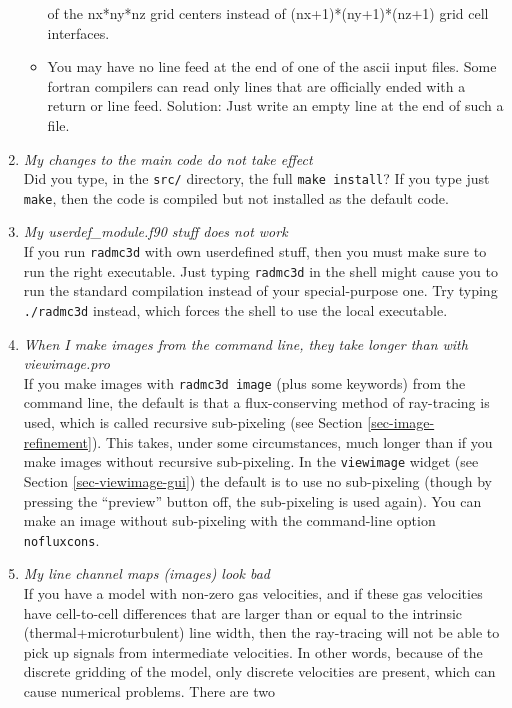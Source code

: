 \documentclass{report}
\begin{document}
\begin{enumerate}
\begin{itemize}
    of the nx*ny*nz grid centers instead of (nx+1)*(ny+1)*(nz+1) grid cell
    interfaces. 
  \item You may have no line feed at the end of one of the ascii input files.
    Some fortran compilers can read only lines that are officially ended with
    a return or line feed. Solution: Just write an empty line at the end of such
    a file.
  \end{itemize}
\item {\em My changes to the main code do not take effect}\\
  Did you type, in the {\small\tt src/} directory, the full {\small\tt make
    install}? If you type just {\small\tt make}, then the code is compiled
  but not installed as the default code.
\item {\em My userdef\_module.f90 stuff does not work}\\
  If you run {\small\tt radmc3d} with own userdefined stuff, then you must
  make sure to run the right executable. Just typing {\small\tt radmc3d} in
  the shell might cause you to run the standard compilation instead of your
  special-purpose one. Try typing {\small\tt ./radmc3d} instead, which
  forces the shell to use the local executable.
\item {\em When I make images from the command line, they take longer than with viewimage.pro}\\
  If you make images with {\small\tt radmc3d image} (plus some keywords)
  from the command line, the default is that a flux-conserving method of
  ray-tracing is used, which is called recursive sub-pixeling (see Section
  \ref{sec-image-refinement}). This takes, under some circumstances, much
  longer than if you make images without recursive sub-pixeling. In the 
  {\small\tt viewimage} widget (see Section \ref{sec-viewimage-gui}) the
  default is to use no sub-pixeling (though by pressing the ``preview''
  button off, the sub-pixeling is used again). You can make an image
  without sub-pixeling with the command-line option {\small\tt nofluxcons}.
\item {\em My line channel maps (images) look bad}\\
  If you have a model with non-zero gas velocities, and if these gas
  velocities have cell-to-cell differences that are larger than or equal to
  the intrinsic (thermal+microturbulent) line width, then the ray-tracing
  will not be able to pick up signals from intermediate velocities. In other
  words, because of the discrete gridding of the model, only discrete
  velocities are present, which can cause numerical problems. There are two

\end{enumerate}
\end{document}
